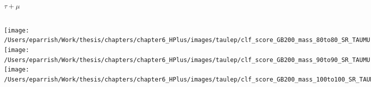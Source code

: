 \documentclass[aspectratio=169,xcolor=table]{beamer}
\begin{document}
    \begin{frame}[t]{$\tau+\mu$}
      \begin{columns}[t]
          \texttt{[image: /Users/eparrish/Work/thesis/chapters/chapter6\_HPlus/images/taulep/clf\_score\_GB200\_mass\_80to80\_SR\_TAUMU.png]}
          \texttt{[image: /Users/eparrish/Work/thesis/chapters/chapter6\_HPlus/images/taulep/clf\_score\_GB200\_mass\_90to90\_SR\_TAUMU.png]}
          \texttt{[image: /Users/eparrish/Work/thesis/chapters/chapter6\_HPlus/images/taulep/clf\_score\_GB200\_mass\_100to100\_SR\_TAUMU.png]}

          \texttt{[image: /Users/eparrish/Work/thesis/chapters/chapter6\_HPlus/images/taulep/clf\_score\_GB200\_mass\_110to110\_SR\_TAUMU.png]}
          \texttt{[image: /Users/eparrish/Work/thesis/chapters/chapter6\_HPlus/images/taulep/clf\_score\_GB200\_mass\_120to120\_SR\_TAUMU.png]}
          \texttt{[image: /Users/eparrish/Work/thesis/chapters/chapter6\_HPlus/images/taulep/clf\_score\_GB200\_mass\_130to130\_SR\_TAUMU.png]}
          \texttt{[image: /Users/eparrish/Work/thesis/chapters/chapter6\_HPlus/images/taulep/clf\_score\_GB200\_mass\_140to140\_SR\_TAUMU.png]}
          \texttt{[image: /Users/eparrish/Work/thesis/chapters/chapter6\_HPlus/images/taulep/clf\_score\_GB200\_mass\_150to150\_SR\_TAUMU.png]}
          \texttt{[image: /Users/eparrish/Work/thesis/chapters/chapter6\_HPlus/images/taulep/clf\_score\_GB200\_mass\_160to160\_SR\_TAUMU.png]}

          \texttt{[image: /Users/eparrish/Work/thesis/chapters/chapter6\_HPlus/images/taulep/clf\_score\_GB200\_mass\_170to170\_SR\_TAUMU.png]}
          \texttt{[image: /Users/eparrish/Work/thesis/chapters/chapter6\_HPlus/images/taulep/clf\_score\_GB200\_mass\_180to180\_SR\_TAUMU.png]}
          \texttt{[image: /Users/eparrish/Work/thesis/chapters/chapter6\_HPlus/images/taulep/clf\_score\_GB200\_mass\_190to190\_SR\_TAUMU.png]}

      \end{columns}
    \end{frame}
\end{document}
